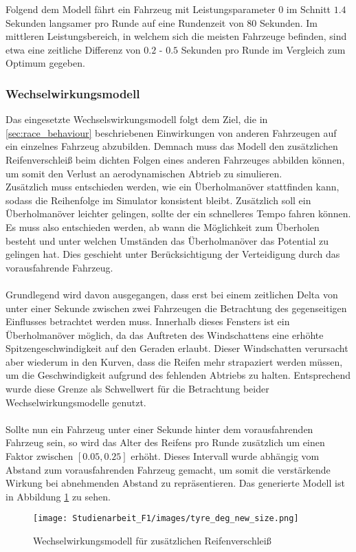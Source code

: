 Folgend dem Modell fährt ein Fahrzeug mit Leistungsparameter $0$ im Schnitt $1.4$ Sekunden langsamer pro Runde auf eine Rundenzeit von 80 Sekunden. Im mittleren Leistungsbereich, in welchem sich die meisten Fahrzeuge befinden, sind etwa eine zeitliche Differenz von $0.2$ - $0.5$ Sekunden pro Runde im Vergleich zum Optimum gegeben.

\subsubsection{Wechselwirkungsmodell}
Das eingesetzte Wechselswirkungsmodell folgt dem Ziel, die in \ref{sec:race_behaviour} beschriebenen Einwirkungen von anderen Fahrzeugen auf ein einzelnes Fahrzeug abzubilden. Demnach muss das Modell den zusätzlichen Reifenverschleiß beim dichten Folgen eines anderen Fahrzeuges abbilden können, um somit den Verlust an aerodynamischen Abtrieb zu simulieren. \\
Zusätzlich muss entschieden werden, wie ein Überholmanöver stattfinden kann, sodass die Reihenfolge im Simulator konsistent bleibt. Zusätzlich soll ein Überholmanöver leichter gelingen, sollte der  ein schnelleres Tempo fahren können. Es muss also entschieden werden, ab wann die Möglichkeit zum Überholen besteht und unter welchen Umständen das Überholmanöver das Potential zu gelingen hat. Dies geschieht unter Berücksichtigung der Verteidigung durch das vorausfahrende Fahrzeug.\\
\\
Grundlegend wird davon ausgegangen, dass erst bei einem zeitlichen Delta von unter einer Sekunde zwischen zwei Fahrzeugen die Betrachtung des gegenseitigen Einflusses betrachtet werden muss. Innerhalb dieses Fensters ist ein Überholmanöver möglich, da das Auftreten des Windschattens eine erhöhte Spitzengeschwindigkeit auf den Geraden erlaubt. Dieser Windschatten verursacht aber wiederum in den Kurven, dass die Reifen mehr strapaziert werden müssen, um die Geschwindigkeit aufgrund des fehlenden Abtriebs zu halten. Entsprechend wurde diese Grenze als Schwellwert für die Betrachtung beider Wechselwirkungsmodelle genutzt.\\\\
Sollte nun ein Fahrzeug unter einer Sekunde hinter dem vorausfahrenden Fahrzeug sein, so wird das Alter des Reifens pro Runde zusätzlich um einen Faktor zwischen $[0.05, 0.25]$ erhöht. Dieses Intervall wurde abhängig vom Abstand zum vorausfahrenden Fahrzeug gemacht, um somit die verstärkende Wirkung bei abnehmenden Abstand zu repräsentieren. Das generierte Modell ist in Abbildung \ref{fig:add_tyre_degradation} zu sehen.\\
\begin{figure}
    \texttt{[image: Studienarbeit\_F1/images/tyre\_deg\_new\_size.png]}
    \caption{Wechselwirkungsmodell für zusätzlichen Reifenverschleiß}
    \label{fig:add_tyre_degradation}
\end{figure}

